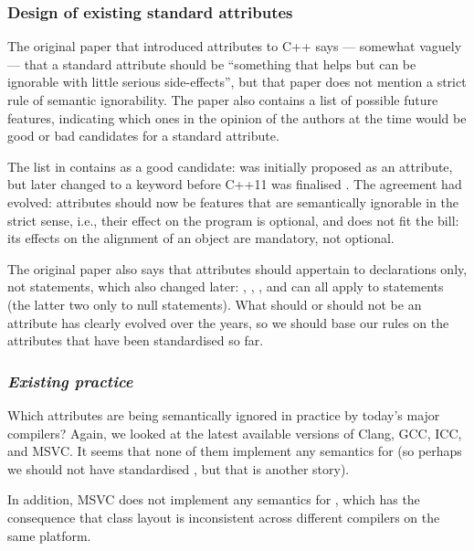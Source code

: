 \subsubsection{Design of existing standard attributes}

The original paper that introduced attributes to C++ \cite{N2761} says --- somewhat vaguely --- that a standard attribute should be  ``something that helps but can be ignorable with little serious side-effects'', but that paper does not mention a strict rule of semantic ignorability. The paper also contains a list of possible future features, indicating which ones in the opinion of the authors at the time would be good or bad candidates for a standard attribute.

The list in \cite{N2761} contains  as a good candidate:  was initially proposed as an attribute, but later changed to a keyword before C++11 was finalised \cite{N3190}. The agreement had evolved: attributes should now be features that are semantically ignorable in the strict sense, i.e., their effect on the program is optional, and  does not fit the bill: its effects on the alignment of an object are mandatory, not optional.

The original paper also says that attributes should appertain to declarations only, not statements, which also changed later: , , , and  can all apply to statements (the latter two only to null statements). What should or should not be an attribute has clearly evolved over the years, so we should base our rules on the attributes that have been standardised so far.


\subsubsection*{\emph{Existing practice}}

Which attributes are being semantically ignored in practice by today's major compilers? Again, we looked at the latest available versions of Clang, GCC, ICC, and MSVC. It seems that none of them implement any semantics for  (so perhaps we should not have standardised , but that is another story).

In addition, MSVC does not implement any semantics for , which has the consequence that class layout is inconsistent across different compilers on the same platform.

